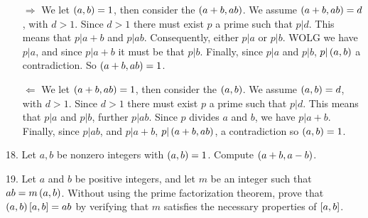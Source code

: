 \begin{mdframed}[style=darkAnswer,frametitle={Joe Starr}]
\begin{itemize}[align=left]
    \item [$\Rightarrow$]{
    We let $\left(a,b\right)=1$, then consider the $\left(a+b,ab\right)$. We assume 
    $\left(a+b,ab\right)=d$, with $d>1$. Since $d>1$ there must exist $p$ a prime such that
    $p\vert d$. This means that $p\vert a+b$ and $p \vert ab$. Consequently, either
    $p\vert a$ or $p\vert b$. WOLG we have $p\vert a$, and since $p\vert a+b$ it 
    must be that $p\vert b$. Finally, since $p\vert a $ and $p\vert b$, 
    $p\vert \left(a,b\right)$ a contradiction. So $\left(a+b,ab\right)=1$.
    }
    \item [$\Leftarrow$]{
    We let $\left(a+b,ab\right)=1$, then consider the $\left(a,b\right)$. We assume 
    $\left(a,b\right)=d$, with $d>1$. Since $d>1$ there must exist $p$ a prime such that
    $p\vert d$. This means that $p\vert a$ and $p\vert b$, further $p \vert ab$. 
    Since $p$ divides $a$ and $b$, we have $p\vert a+b$. Finally, since $p\vert ab$, 
    and $p\vert a+b$, $p\vert \left(a+b,ab\right)$, a contradiction so $\left(a,b\right)=1$.
    }
\end{itemize}
\end{mdframed}
\newpage
\begin{mdframed}[style=darkQuesion]
18. Let $a,b$ be nonzero integers with $\left(a,b\right)=1$. Compute $\left(a+b,a-b\right)$. 
\end{mdframed}

\begin{mdframed}[style=darkAnswer,frametitle={Joe Starr}]
    
\end{mdframed}
\newpage
\begin{mdframed}[style=darkQuesion]
19. Let $a$ and $b$ be positive integers, and let $m$ be an integer such that 
$ab=m\left(a,b\right)$. Without using the prime factorization theorem, prove that 
$\left(a,b\right)\left[a,b\right]=ab$ by verifying that $m$ satisfies the necessary properties
of $\left[a,b\right]$.
\end{mdframed}


